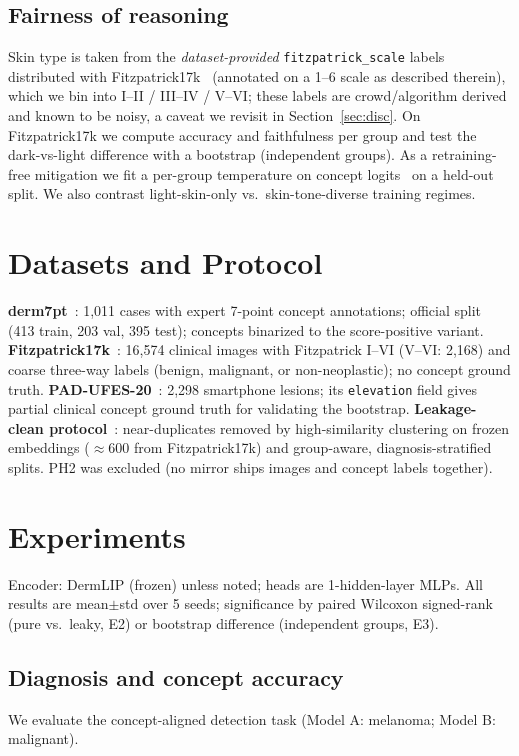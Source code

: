 \documentclass{svproc}
\begin{document}
\subsection{Fairness of reasoning}
Skin type is taken from the \emph{dataset-provided} \texttt{fitzpatrick\_scale} labels
distributed with Fitzpatrick17k~\cite{groh2021} (annotated on a 1--6 scale as described
therein), which we bin into I--II / III--IV / V--VI; these labels are crowd/algorithm
derived and known to be noisy, a caveat we revisit in Section~\ref{sec:disc}. On Fitzpatrick17k we
compute accuracy and faithfulness per group and test the dark-vs-light difference with a
bootstrap (independent groups). As a retraining-free mitigation we fit a per-group
temperature on concept logits~\cite{guo2017} on a held-out split. We also contrast
light-skin-only vs.\ skin-tone-diverse training regimes.

\section{Datasets and Protocol}
\textbf{derm7pt}~\cite{kawahara2019}: 1{,}011 cases with expert 7-point concept
annotations; official split (413 train, 203 val, 395 test); concepts binarized to the
score-positive variant. \textbf{Fitzpatrick17k}~\cite{groh2021}: 16{,}574 clinical images with
Fitzpatrick I--VI (V--VI: 2{,}168) and coarse three-way labels (benign, malignant, or
non-neoplastic); no concept ground truth. \textbf{PAD-UFES-20}~\cite{pacheco2020}: 2{,}298 smartphone
lesions; its \texttt{elevation} field gives partial clinical concept ground truth for
validating the bootstrap. \textbf{Leakage-clean protocol}~\cite{cassidy2022}: near-duplicates removed by
high-similarity clustering on frozen embeddings ($\approx$600 from Fitzpatrick17k) and
group-aware, diagnosis-stratified splits. PH2 was excluded (no mirror ships images and
concept labels together).

\section{Experiments}
Encoder: DermLIP (frozen) unless noted; heads are 1-hidden-layer MLPs. All results are
mean$\pm$std over 5 seeds; significance by paired Wilcoxon signed-rank (pure vs.\ leaky,
E2) or bootstrap difference (independent groups, E3).

\subsection{Diagnosis and concept accuracy}
We evaluate the concept-aligned detection task (Model A: melanoma; Model B: malignant).
\end{document}
